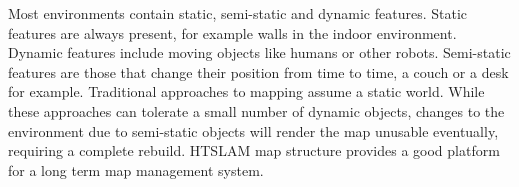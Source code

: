 Most environments contain static, semi-static and dynamic
features. Static features are always present, for example walls in the
indoor environment. Dynamic features include moving objects like
humans or other robots. Semi-static features are those that change
their position from time to time, a couch or a desk for
example. Traditional approaches to mapping assume a static
world. While these approaches can tolerate a small number of dynamic
objects, changes to the environment due to semi-static objects will
render the map unusable eventually, requiring a complete rebuild.
HTSLAM map structure provides a good platform for a long term map
management system.




